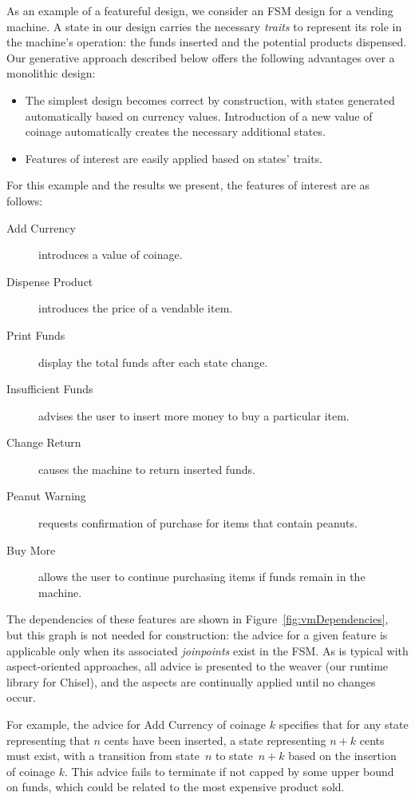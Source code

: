 \documentclass[sigplan,anonymous,review]{acmart}
\begin{document}
As an example of a featureful design, we consider an FSM design for a vending machine.   A state in our design carries the necessary \emph{traits} to represent its role in the machine's operation:  the funds inserted and the potential products dispensed.  Our generative approach described below offers the following advantages over a monolithic design:
\begin{itemize}
    \item The simplest design becomes correct by construction, with states generated automatically based on currency values.  Introduction of a new value of coinage automatically creates the necessary additional states.
    \item Features of interest are easily applied based on states' traits.
\end{itemize}
For this example and the results we present, the features of interest are as follows:
\begin{description}
    \item[Add Currency] introduces a value of coinage.
    \item[Dispense Product] introduces the price of a vendable item.
    \item[Print Funds] display the total funds after each state change.
    \item[Insufficient Funds] advises the user to insert more money to buy a particular item.
    \item[Change Return] causes the machine to return inserted funds.
    \item[Peanut Warning] requests confirmation of purchase for items that contain peanuts.
    \item[Buy More] allows the user to continue purchasing items if funds remain in the machine.
\end{description}
The dependencies of these features are shown in Figure~\ref{fig:vmDependencies}, but this graph is not needed for construction:  the advice for a given feature is applicable only when its associated \emph{joinpoints} exist in the FSM.  As is typical with aspect-oriented approaches, all advice is presented to the weaver (our runtime library for Chisel), and the aspects are continually applied until no changes occur.

For example, the advice for Add Currency of coinage $k$ specifies that for any state representing that $n$ cents have been inserted, a state representing $n+k$ cents must exist, with a transition from state~$n$ to state~$n+k$ based on the insertion of coinage $k$.   This advice fails to terminate if not capped by some upper bound on funds, which could be related to the most expensive product sold.
\end{document}
